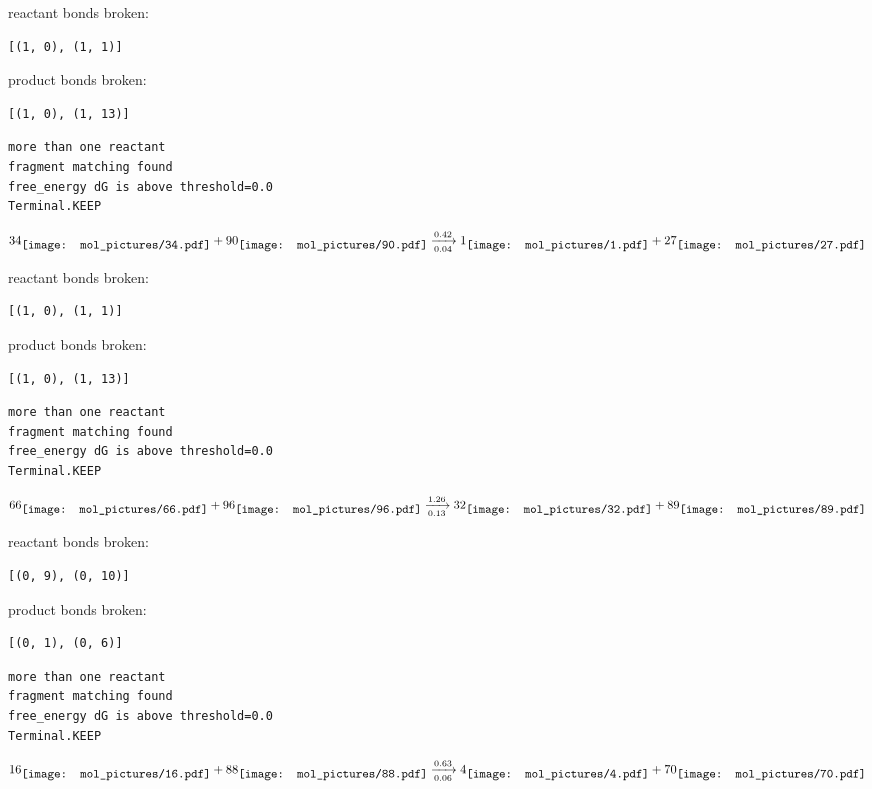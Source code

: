 \documentclass{article}
\begin{document}
reactant bonds broken:\begin{verbatim}
[(1, 0), (1, 1)]
\end{verbatim}
product bonds broken:\begin{verbatim}
[(1, 0), (1, 13)]
\end{verbatim}




\vspace{1cm}
\begin{verbatim}
more than one reactant
fragment matching found
free_energy dG is above threshold=0.0
Terminal.KEEP
\end{verbatim}
$$
34
\raisebox{-.5\height}{\texttt{[image: mol\_pictures/34.pdf]}}
+
90
\raisebox{-.5\height}{\texttt{[image: mol\_pictures/90.pdf]}}
\xrightarrow[0.04]{0.42}
1
\raisebox{-.5\height}{\texttt{[image: mol\_pictures/1.pdf]}}
+
27
\raisebox{-.5\height}{\texttt{[image: mol\_pictures/27.pdf]}}
$$


reactant bonds broken:\begin{verbatim}
[(1, 0), (1, 1)]
\end{verbatim}
product bonds broken:\begin{verbatim}
[(1, 0), (1, 13)]
\end{verbatim}




\vspace{1cm}
\begin{verbatim}
more than one reactant
fragment matching found
free_energy dG is above threshold=0.0
Terminal.KEEP
\end{verbatim}
$$
66
\raisebox{-.5\height}{\texttt{[image: mol\_pictures/66.pdf]}}
+
96
\raisebox{-.5\height}{\texttt{[image: mol\_pictures/96.pdf]}}
\xrightarrow[0.13]{1.26}
32
\raisebox{-.5\height}{\texttt{[image: mol\_pictures/32.pdf]}}
+
89
\raisebox{-.5\height}{\texttt{[image: mol\_pictures/89.pdf]}}
$$


reactant bonds broken:\begin{verbatim}
[(0, 9), (0, 10)]
\end{verbatim}
product bonds broken:\begin{verbatim}
[(0, 1), (0, 6)]
\end{verbatim}




\vspace{1cm}
\begin{verbatim}
more than one reactant
fragment matching found
free_energy dG is above threshold=0.0
Terminal.KEEP
\end{verbatim}
$$
16
\raisebox{-.5\height}{\texttt{[image: mol\_pictures/16.pdf]}}
+
88
\raisebox{-.5\height}{\texttt{[image: mol\_pictures/88.pdf]}}
\xrightarrow[0.06]{0.63}
4
\raisebox{-.5\height}{\texttt{[image: mol\_pictures/4.pdf]}}
+
70
\raisebox{-.5\height}{\texttt{[image: mol\_pictures/70.pdf]}}
$$
\end{document}
